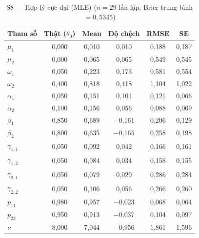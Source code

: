 \documentclass[11pt,a4paper]{article}
\begin{document}
\begin{table}[H]\centering\scriptsize
\caption{S8 --- Hợp lý cực đại (MLE) ($n=29$ lần lặp, Brier trung bình $=0{,}5345$)}
\begin{tabularx}{\textwidth}{l C C C C C}
\toprule
\textbf{Tham số} & \textbf{Thật ($\theta_0$)} & \textbf{Mean} & \textbf{Độ chệch} & \textbf{RMSE} & \textbf{SE} \\
\midrule
$\mu_1$ & 0{,}000 & 0{,}010 & 0{,}010 & 0{,}188 & 0{,}187 \\
$\mu_2$ & 0{,}000 & 0{,}065 & 0{,}065 & 0{,}549 & 0{,}545 \\
$\omega_1$ & 0{,}050 & 0{,}223 & 0{,}173 & 0{,}581 & 0{,}554 \\
$\omega_2$ & 0{,}400 & 0{,}818 & 0{,}418 & 1{,}104 & 1{,}022 \\
$\alpha_1$ & 0{,}050 & 0{,}151 & 0{,}101 & 0{,}121 & 0{,}066 \\
$\alpha_2$ & 0{,}100 & 0{,}156 & 0{,}056 & 0{,}088 & 0{,}069 \\
$\beta_1$ & 0{,}850 & 0{,}689 & $-$0{,}161 & 0{,}206 & 0{,}129 \\
$\beta_2$ & 0{,}800 & 0{,}635 & $-$0{,}165 & 0{,}258 & 0{,}198 \\
$\gamma_{1,1}$ & 0{,}050 & 0{,}092 & 0{,}042 & 0{,}166 & 0{,}161 \\
$\gamma_{1,2}$ & 0{,}050 & 0{,}084 & 0{,}034 & 0{,}158 & 0{,}155 \\
$\gamma_{2,1}$ & 0{,}050 & 0{,}079 & 0{,}029 & 0{,}286 & 0{,}284 \\
$\gamma_{2,2}$ & 0{,}050 & 0{,}106 & 0{,}056 & 0{,}266 & 0{,}260 \\
$p_{11}$ & 0{,}980 & 0{,}957 & $-$0{,}023 & 0{,}068 & 0{,}064 \\
$p_{22}$ & 0{,}950 & 0{,}913 & $-$0{,}037 & 0{,}104 & 0{,}097 \\
$\nu$ & 8{,}000 & 7{,}044 & $-$0{,}956 & 1{,}861 & 1{,}596 \\
\bottomrule
\end{tabularx}
\end{table}
\end{document}
